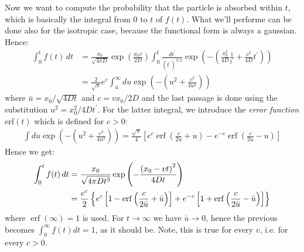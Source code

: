 \documentclass[4apaper,11pt,fleqn]{article}
\theoremstyle{remark}
\theoremstyle{definition}
\begin{document}
Now we want to compute the probability that the particle is absorbed within $t$, which is basically the integral from 0 to $t$ of $f(t)$. What we'll performe can be done also for the isotropic case, because the functional form is always a gaussian.
Hence:
\begin{align*}
  \int_0^t f(t) \, dt &= \frac{x_{0}}{\sqrt{4 \pi D}} \exp \left(\frac{x_{0} v}{2 D}\right) \int_{0}^{t} \frac{d t^{\prime}}{\left(t^{\prime}\right)^{3 / 2}} \exp \left(-\left(\frac{x_{0}^{2}}{4 D} \frac{1}{t^{\prime}}+\frac{v^{2}}{4 D} t^{\prime}\right)\right) \\
                      &= \frac{2}{\sqrt{\pi}} e^{c} \int_{\bar{u}}^{\infty} d u \exp \left(-\left(u^{2}+\frac{c^{2}}{4 u^{2}}\right)\right)
\end{align*}
where $\bar{u} = x_0/\sqrt{4Dt}$ and $c= v x_0/2D$ and the last passage is done using the substitution $u^2=x_0^2/4Dt^'$.
For the latter integral, we introduce the \emph{error function} erf$(t)$ which is defined for $c>0$:
\begin{align*}
  \int d u \exp \left(-\left(u^{2}+\frac{c^{2}}{4 u^{2}}\right)\right)=\frac{\sqrt{\pi}}{4}\left[e^{c} \operatorname{erf}\left(\frac{c}{2 u}+u\right)-e^{-c} \operatorname{erf}\left(\frac{c}{2 u}-u\right)\right]
\end{align*}
Hence we get:
\begin{align}
  \label{eq:erf}
  \int_0^t f(t) \, dt &= \frac{x_{0}}{\sqrt{4 \pi D t^{3}}} \exp \left(-\frac{\left(x_{0}-v t\right)^{2}}{4 D t}\right)\\ \notag
                      &=  \frac{e^{c}}{2}\left\{e^{c}\left[1-\operatorname{erf}\left(\frac{c}{2 \bar{u}}+\bar{u}\right)\right]+e^{-c}\left[1+\operatorname{erf}\left(\frac{c}{2 \bar{u}}-\bar{u}\right)\right]\right\}
\end{align}
where $\operatorname{erf}(\infty)=1$ is used.
For $t \rightarrow \infty$ we have $\bar{u} \rightarrow 0$, hence the previous becomes $\int_0^\infty f(t) dt = 1$, as it should be. Note, this is true for every $v$, i.e. for every $c>0$.
\end{document}

